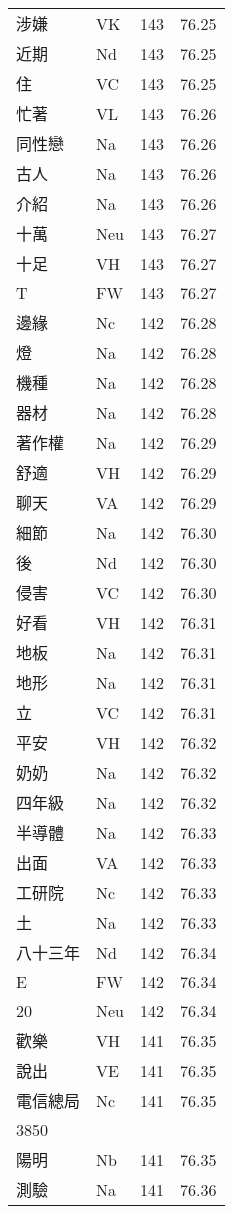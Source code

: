 \documentclass[twocolumn]{book}
\begin{document}
\begin{supertabular}{llrr}
涉嫌 & VK & 143 &  76.25\\
近期 & Nd & 143 &  76.25\\
住 & VC & 143 &  76.25\\
忙著 & VL & 143 &  76.26\\
同性戀 & Na & 143 &  76.26\\
古人 & Na & 143 &  76.26\\
介紹 & Na & 143 &  76.26\\
十萬 & Neu & 143 &  76.27\\
十足 & VH & 143 &  76.27\\
T & FW & 143 &  76.27\\
邊緣 & Nc & 142 &  76.28\\
燈 & Na & 142 &  76.28\\
機種 & Na & 142 &  76.28\\
器材 & Na & 142 &  76.28\\
著作權 & Na & 142 &  76.29\\
舒適 & VH & 142 &  76.29\\
聊天 & VA & 142 &  76.29\\
細節 & Na & 142 &  76.30\\
後 & Nd & 142 &  76.30\\
侵害 & VC & 142 &  76.30\\
好看 & VH & 142 &  76.31\\
地板 & Na & 142 &  76.31\\
地形 & Na & 142 &  76.31\\
立 & VC & 142 &  76.31\\
平安 & VH & 142 &  76.32\\
奶奶 & Na & 142 &  76.32\\
四年級 & Na & 142 &  76.32\\
半導體 & Na & 142 &  76.33\\
出面 & VA & 142 &  76.33\\
工研院 & Nc & 142 &  76.33\\
土 & Na & 142 &  76.33\\
八十三年 & Nd & 142 &  76.34\\
E & FW & 142 &  76.34\\
20 & Neu & 142 &  76.34\\
歡樂 & VH & 141 &  76.35\\
說出 & VE & 141 &  76.35\\
電信總局 & Nc & 141 &  76.35\\
3850\\
陽明 & Nb & 141 &  76.35\\
測驗 & Na & 141 &  76.36\\

\end{supertabular}
\end{document}
